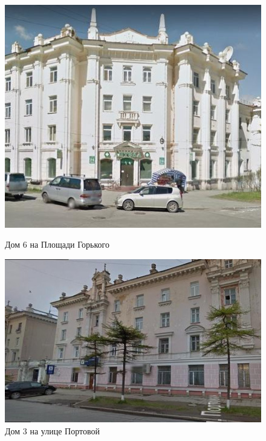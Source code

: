 \begin{figure}[H]
\begin{changemargin}{-1.5cm}{-2cm}
  \begin{center}
    \begin{minipage}[h]{0.4\linewidth}
        \includegraphics[width=1\textwidth]{authors/sydchak-fig-1.jpg}
        \caption{Дом 6 на Площади Горького}
        \label{fig:sydchak-fig-1}
    \end{minipage}
\hfill
    \begin{minipage}[h]{0.52\linewidth}
        \includegraphics[width=1\textwidth]{authors/sydchak-fig-2.jpg}
        \caption{Дом 3 на улице Портовой}
        \label{fig:sydchak-fig-2}
    \end{minipage}


  \end{center}
\end{changemargin}

\end{figure}

